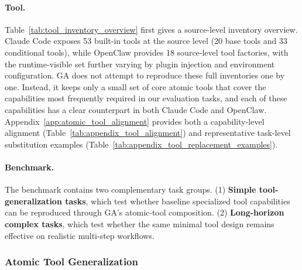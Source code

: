 \paragraph{Tool.}
Table~\ref{tab:tool_inventory_overview} first gives a source-level inventory overview. Claude Code exposes 53 built-in tools at the source level (20 base tools and 33 conditional tools), while OpenClaw provides 18 source-level tool factories, with the runtime-visible set further varying by plugin injection and environment configuration. GA does not attempt to reproduce these full inventories one by one. Instead, it keeps only a small set of core atomic tools that cover the capabilities most frequently required in our evaluation tasks, and each of these capabilities has a clear counterpart in both Claude Code and OpenClaw. Appendix~\ref{app:atomic_tool_alignment} provides both a capability-level alignment (Table~\ref{tab:appendix_tool_alignment}) and representative task-level substitution examples (Table~\ref{tab:appendix_tool_replacement_examples}).


\paragraph{Benchmark.}
The benchmark contains two complementary task groups. (1) \textbf{Simple tool-generalization tasks}, which test whether baseline specialized tool capabilities can be reproduced through GA's atomic-tool composition. (2) \textbf{Long-horizon complex tasks}, which test whether the same minimal tool design remains effective on realistic multi-step workflows.

\subsubsection{Atomic Tool Generalization}
\label{sec:exp_atomic_tool_generalization}

\begin{table}[t]
\centering
\caption{\textbf{Aggregated results on long-horizon complex tasks.} This table reports the average outcomes over the long-horizon task set rather than expanding into per-task detail.}
\def\arraystretch{0.99}
\setlength{\tabcolsep}{0.42em}
\label{tab:tooluse_long_horizon}
\end{table}

